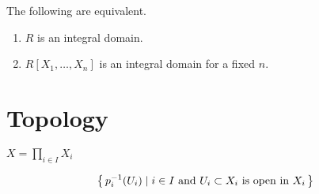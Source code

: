 \begin{corollary}
    The following are equivalent.
    \begin{enumerate}
        \item \(R\) is an integral domain.
        \item \(R[X_1, \ldots, X_n]\) is an integral domain for a fixed \(n\).
    \end{enumerate}
\end{corollary}

\part{Topology}

\begin{defbox}
    \begin{definition}
        \label{def:product_topology}
        \(X = \prod_{i \in I} X_i\)

        \begin{align*}
            \left\{\, p_{i}^{-1}(U_i) \mathrel{\mid} i \in I \text{ and } U_i \subset X_i \text{ is open in }X_i \,\right\}
        \end{align*}
    \end{definition}
\end{defbox}